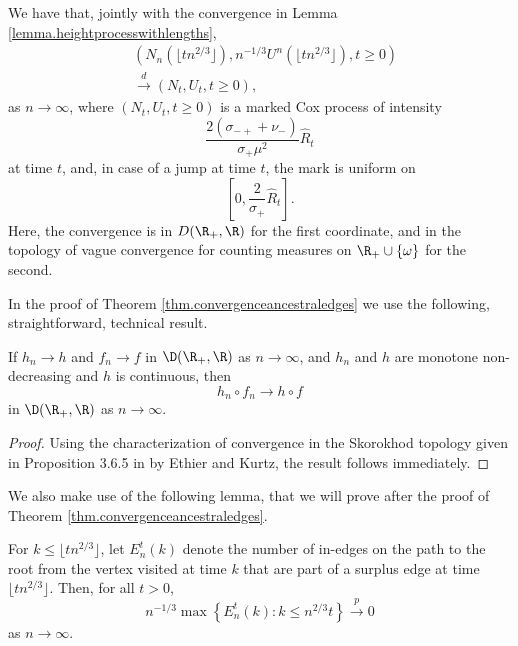 \begin{theorem}\label{thm.convergenceancestraledges}
We have that, jointly with the convergence in Lemma \ref{lemma.heightprocesswithlengths},
\begin{align*}&\left(N_n\left(\lfloor tn^{2/3}\rfloor\right), n^{-1/3}U^n\left(\lfloor tn^{2/3}\rfloor\right),t\geq 0\right)\\
&\overset{d}{\to}\left(N_t,U_t,t\geq 0\right),\end{align*}
as $n\to \infty$, where $(N_t,U_t,t\geq 0)$ is a marked Cox process of intensity $$\frac{2(\sigma_{-+}+\nu_-)}{\sigma_+\mu^2} \hat{R}_t$$ at time $t$, and, in case of a jump at time $t$, the mark is uniform on $$[0,\frac{2}{\sigma_+} \hat{R}_t].$$ 
Here, the convergence is in $D(\R_+,\R)$ for the first coordinate, and in the topology of vague convergence for counting measures on $\R_+\cup \{\omega\}$ for the second. 
\end{theorem}
In the proof of Theorem \ref{thm.convergenceancestraledges} we use the following, straightforward, technical result.
\begin{lemma}\label{lemma.technicalcomposedfunctions}
If $h_n\to h$ and $f_n\to f$ in $\D(\R_+,\R)$ as $n\to\infty$, and $h_n$ and $h$ are monotone non-decreasing and $h$ is continuous, then 
$$h_n\circ f_n \to h\circ f$$
in $\D(\R_+,\R)$ as $n\to\infty$.
\end{lemma}
\begin{proof}
Using the characterization of convergence in the Skorokhod topology given in Proposition 3.6.5 in \cite{ethierMarkovProcessesCharacterization1986} by Ethier and Kurtz, the result follows immediately.
\end{proof}
We also make use of the following lemma, that we will prove after the proof of Theorem \ref{thm.convergenceancestraledges}. 
\begin{lemma}\label{lemma.usedancestralonpathtoroot}
For $k\leq \lfloor tn^{2/3}\rfloor$, let $E^t_n(k)$ denote the number of in-edges on the path to the root from the vertex visited at time $k$ that are part of a surplus edge at time $\lfloor tn^{2/3}\rfloor$. Then, for all $t>0$,
$$n^{-1/3}\max\left\{E^t_n(k):k\leq n^{2/3}t\right\}\overset{p}{\to}0$$
as $n\to \infty$.
\end{lemma}

